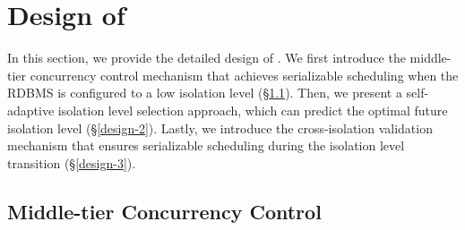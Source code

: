\section{Design of \sysname}
In this section, we provide the detailed design of \sysname. We first introduce the middle-tier concurrency control mechanism that achieves serializable scheduling when the RDBMS is configured to a low isolation level (\S\ref{sec:validation-based-cc}). Then, we present a self-adaptive isolation level selection approach, which can predict the optimal future isolation level (\S\ref{design-2}). Lastly, we introduce the cross-isolation validation mechanism that ensures serializable scheduling during the isolation level transition (\S\ref{design-3}). 

\subsection{Middle-tier Concurrency Control \label{design-1}}
\label{sec:validation-based-cc}



